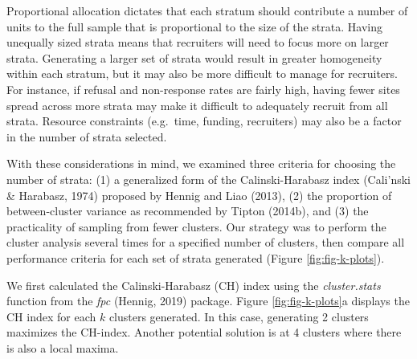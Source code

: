 \documentclass[
  english,
  man,floatsintext]{apa6}
\begin{document}
Proportional allocation dictates that each stratum should contribute a number of units to the full sample that is proportional to the size of the strata. Having unequally sized strata means that recruiters will need to focus more on larger strata. Generating a larger set of strata would result in greater homogeneity within each stratum, but it may also be more difficult to manage for recruiters. For instance, if refusal and non-response rates are fairly high, having fewer sites spread across more strata may make it difficult to adequately recruit from all strata. Resource constraints (e.g.~time, funding, recruiters) may also be a factor in the number of strata selected.

With these considerations in mind, we examined three criteria for choosing the number of strata: (1) a generalized form of the Calinski-Harabasz index (Cali'nski \& Harabasz, 1974) proposed by Hennig and Liao (2013), (2) the proportion of between-cluster variance as recommended by Tipton (2014b), and (3) the practicality of sampling from fewer clusters. Our strategy was to perform the cluster analysis several times for a specified number of clusters, then compare all performance criteria for each set of strata generated (Figure \ref{fig:fig-k-plots}).

We first calculated the Calinski-Harabasz (CH) index using the \emph{cluster.stats} function from the \emph{fpc} (Hennig, 2019) package. Figure \ref{fig:fig-k-plots}a displays the CH index for each \(k\) clusters generated. In this case, generating 2 clusters maximizes the CH-index. Another potential solution is at 4 clusters where there is also a local maxima.
\end{document}
